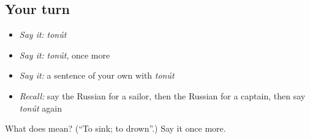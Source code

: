 \subsection*{Your turn}
\begin{itemize}
\raggedright
  \item \emph{Say it:} \emph{tonút}
  \item \emph{Say it:} \emph{tonút}, once more
  \item \emph{Say it:} a sentence of your own with \emph{tonút}
  \item \emph{Recall:} say the Russian for a sailor, then the Russian for a captain, then say \emph{tonút} again
\end{itemize}

\begin{tcolorbox}[breakable,colback=teal!4,colframe=teal!35!black,title={Before you move on}]
What does  mean? (\textquotedblleft{}To sink; to drown\textquotedblright{}.) Say it once more.
\end{tcolorbox}
